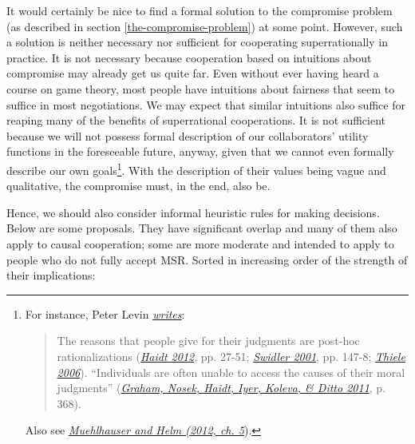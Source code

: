 It would certainly be nice to find a formal solution to the compromise
problem (as described in section
\ref{the-compromise-problem}) at some point. However, such a solution is neither
necessary nor sufficient for cooperating superrationally in practice. It
is not necessary because cooperation based on intuitions about
compromise may already get us quite far. Even without ever having heard
a course on game theory, most people have intuitions about fairness that
seem to suffice in most negotiations. We may expect that similar
intuitions also suffice for reaping many of the benefits of
superrational cooperations. It is not sufficient because we will not
possess formal description of our collaborators' utility functions in
the foreseeable future, anyway, given that we cannot even formally
describe our own goals\footnote{\label{we-do-not-know-our-utility-function}
  For instance, Peter Levin
  \href{http://peterlevine.ws/?p=16998}{\emph{writes}}:

  \begin{quote}
  The reasons that people give for their judgments are post-hoc
  rationalizations
  (\href{https://en.wikipedia.org/wiki/The_Righteous_Mind}{\emph{Haidt
  2012}}, pp. 27-51;
  \href{https://en.wikipedia.org/wiki/Ann_Swidler\#Major_works}{\emph{Swidler
  2001}}, pp. 147-8;
  \href{http://assets.cambridge.org/97805218/64442/frontmatter/9780521864442_frontmatter.pdf}{\emph{Thiele
  2006}}). ``Individuals are often unable to access the causes of their
  moral judgments''
  (\href{http://citeseerx.ist.psu.edu/viewdoc/download?doi=10.1.1.704.8390\&rep=rep1\&type=pdf}{\emph{Graham,
  Nosek, Haidt, Iyer, Koleva, \& Ditto 2011}}, p. 368).
  \end{quote}

  Also see
  \href{https://intelligence.org/files/IE-ME.pdf}{\emph{Muehlhauser and
  Helm (2012, ch. 5}}).}. With the description of their values being
vague and qualitative, the compromise must, in the end, also be.

Hence, we should also consider informal heuristic rules for making
decisions. Below are some proposals. They have significant overlap and
many of them also apply to causal cooperation; some are more moderate
and intended to apply to people who do not fully accept MSR. Sorted in
increasing order of the strength of their implications:

